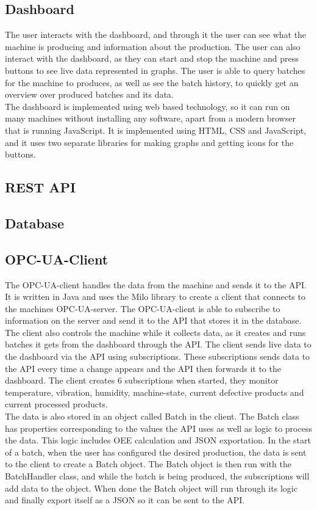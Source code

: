 \subsection{Dashboard}
The user interacts with the dashboard, and through it the user can see what the
machine is producing and information about the production. The user can also
interact with the dashboard, as they can start and stop the machine and press
buttons to see live data represented in graphs. The user is able to query
batches for the machine to produces, as well as see the batch history, to
quickly get an overview over produced batches and its data.\\

The dashboard is implemented using web based technology, so it can run on many
machines without installing any software, apart from a modern browser that is
running JavaScript. It is implemented using HTML, CSS and JavaScript, and it
uses two separate libraries for making graphs and getting icons for the buttons.

\subsection{REST API}

\subsection{Database}

\subsection{OPC-UA-Client}
The OPC-UA-client handles the data from the machine and sends it to the API. It 
is written in Java and uses the Milo library to create a client that connects to 
the machines OPC-UA-server. The OPC-UA-client is able to subscribe to 
information on the server and send it to the API that stores it in the database.
The client also controls the machine while it collects data, as it creates and
runs batches it gets from the dashboard through the API. The client sends live
data to the dashboard via the API using subscriptions. These subscriptions sends
data to the API every time a change appears and the API then forwards it to the
dashboard. The client creates 6 subscriptions when started, they monitor
temperature, vibration, humidity, machine-state,  current defective products and
current processed products. \\

The data is also stored in an object called Batch in the client. The Batch class
has properties corresponding to the values the API uses as well as logic to
process the data. This logic includes OEE calculation and JSON exportation. In
the start of a batch, when the user has configured the desired production, the
data is sent to the client to create a Batch object. The Batch object is then
run with the BatchHandler class, and while the batch is being produced, the
subscriptions will add data to the object. When done the Batch object will run
through its logic and finally export itself as a JSON so it can be sent to the
API. 
